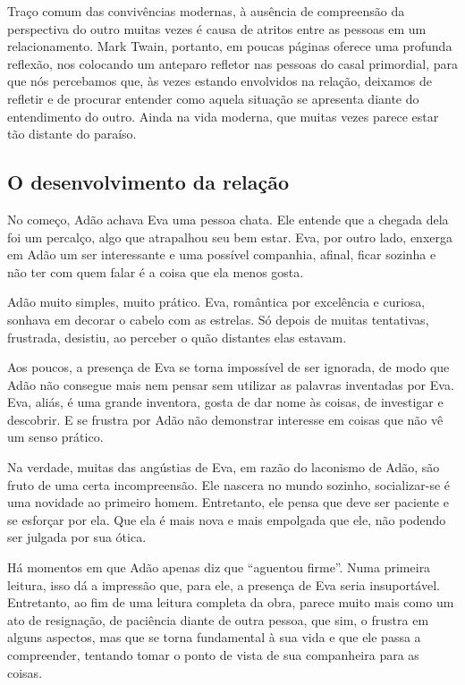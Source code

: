 \documentclass[12pt]{extarticle}
\begin{document}
Traço comum das convivências modernas, à ausência de compreensão da
perspectiva do outro muitas vezes é causa de atritos entre as pessoas em
um relacionamento. Mark Twain, portanto, em poucas páginas oferece uma
profunda reflexão, nos colocando um anteparo refletor nas pessoas do
casal primordial, para que nós percebamos que, às vezes estando
envolvidos na relação, deixamos de refletir e de procurar entender como
aquela situação se apresenta diante do entendimento do outro. Ainda na
vida moderna, que muitas vezes parece estar tão distante do paraíso.

\subsection{O desenvolvimento da relação}

No começo, Adão achava Eva uma pessoa chata. Ele entende que a chegada
dela foi um percalço, algo que atrapalhou seu bem estar. Eva, por outro
lado, enxerga em Adão um ser interessante e uma possível companhia,
afinal, ficar sozinha e não ter com quem falar é a coisa que ela menos
gosta.

Adão muito simples, muito prático. Eva, romântica por excelência e
curiosa, sonhava em decorar o cabelo com as estrelas. Só depois de
muitas tentativas, frustrada, desistiu, ao perceber o quão distantes
elas estavam.

Aos poucos, a presença de Eva se torna impossível de ser ignorada, de
modo que Adão não consegue mais nem pensar sem utilizar as palavras
inventadas por Eva. Eva, aliás, é uma grande inventora, gosta de dar
nome às coisas, de investigar e descobrir. E se frustra por Adão não
demonstrar interesse em coisas que não vê um senso prático.

Na verdade, muitas das angústias de Eva, em razão do laconismo de Adão,
são fruto de uma certa incompreensão. Ele nascera no mundo sozinho,
socializar-se é uma novidade ao primeiro homem. Entretanto, ele pensa
que deve ser paciente e se esforçar por ela. Que ela é mais nova e mais
empolgada que ele, não podendo ser julgada por sua ótica.

Há momentos em que Adão apenas diz que ``aguentou firme''. Numa primeira
leitura, isso dá a impressão que, para ele, a presença de Eva seria
insuportável. Entretanto, ao fim de uma leitura completa da obra, parece
muito mais como um ato de resignação, de paciência diante de outra
pessoa, que sim, o frustra em alguns aspectos, mas que se torna
fundamental à sua vida e que ele passa a compreender, tentando tomar o
ponto de vista de sua companheira para as coisas.
\end{document}
